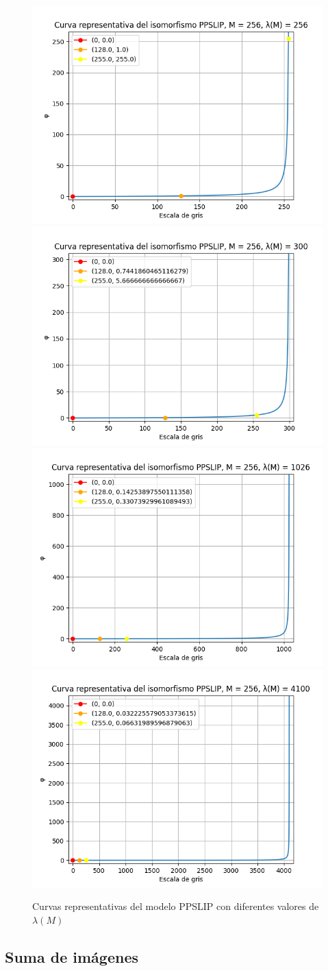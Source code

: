 \begin{figure}
	\begin{center}
		\includegraphics[width=5.5 cm]{images/ppslip_curves/ppslip_curve_256.png}
		\includegraphics[width=5.5 cm]{images/ppslip_curves/ppslip_curve_300.png}
		\includegraphics[width=5.5 cm]{images/ppslip_curves/ppslip_curve_1026.png}
		\includegraphics[width=5.5 cm]{images/ppslip_curves/ppslip_curve_4100.png}
		\caption{Curvas representativas del modelo PPSLIP con diferentes valores de $\lambda(M)$}
	\end{center}
\end{figure}

\subsection{Suma de im\'agenes}

